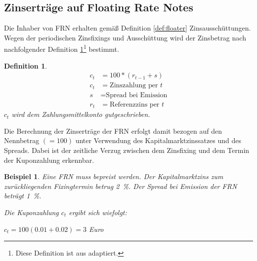 \documentclass[12pt, a4paper]{article}
\theoremstyle{plain}
\newtheorem{definition}{Definition}
\newtheorem{example}{Beispiel}
\begin{document}
\subsection{Zinserträge auf Floating Rate Notes}
\label{sec:zinsertraege_auf_floating_rate_notes}

Die Inhaber von \gls{FRN} erhalten gemäß Definition \ref{def:floater} Zinsausschüttungen.
Wegen der periodischen Zinsfixings und Ausschüttung wird der Zinsbetrag nach nachfolgender Definition \ref{def:zins_floater}\footnote{Diese Definition ist aus \textcite[][S.~52]{veronesi_fixed_2010} adaptiert.} bestimmt.

\begin{definition}
	\label{def:zins_floater}
\begin{align*}
	c_t &= 100 * (r_{t-1} + s)\\
	c_t &= \text{Zinszahlung per $t$}\\
	s &= \text{Spread bei Emission}\\
	r_t &= \text{Referenzzins per $t$}
\end{align*}
$c_t$ wird dem Zahlungsmittelkonto gutgeschrieben.
\end{definition}

Die Berechnung der Zinserträge der \gls{FRN} erfolgt damit bezogen auf den Nennbetrag $(= 100)$ unter Verwendung des Kapitalmarktzinssatzes und des Spreads. Dabei ist der zeitliche Verzug zwischen dem Zinsfixing und dem Termin der Kuponzahlung erkennbar.

\begin{example}
	Eine \gls{FRN} muss bepreist werden. Der Kapitalmarktzins zum zurückliegenden Fixingtermin betrug 2~\%. Der \textit{Spread} bei Emission der \gls{FRN} beträgt 1~\%. 
	
	Die Kuponzahlung $c_t$ ergibt sich wiefolgt:

	$c_t= 100 (0.01 + 0.02) = 3 $ Euro
\end{example}
\clearpage
\printbibliography[title={Literatur}]
\end{document}
